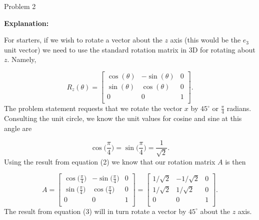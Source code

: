 \begin{problem}{Problem 2}
\begin{highlight}[Solution]
        \noindent \textbf{Explanation:} \vspace*{1em}

        For starters, if we wish to rotate a vector about the $z$ axis (this would be the $e_{3}$ unit vector) we need to use the standard rotation matrix in 3D for rotating about $z$. Namely,

        \setcounter{equation}{0}
        \begin{equation}
            R_{z}(\theta) = 
            \begin{bmatrix}
                \cos{(\theta)} & -\sin{(\theta)} & 0 \\
                \sin{(\theta)} & \cos{(\theta)} & 0 \\
                0 & 0 & 1 \\
            \end{bmatrix}.
        \end{equation}
        The problem statement requests that we rotate the vector $x$ by $45^{\circ}$ or $\frac{\pi}{4}$ radians. Consulting the unit circle, we know the unit values for cosine and sine at this angle are

        \begin{equation}
            \cos{\Big(\frac{\pi}{4}\Big)} = \sin{\Big(\frac{\pi}{4}\Big)} = \frac{1}{\sqrt{2}}.
        \end{equation}
        Using the result from equation (2) we know that our rotation matrix $A$ is then

        \begin{equation}
            A = 
            \begin{bmatrix}
                \cos{\Big(\frac{\pi}{4}\Big)} & -\sin{\Big(\frac{\pi}{4}\Big)} & 0 \\
                \sin{\Big(\frac{\pi}{4}\Big)} & \cos{\Big(\frac{\pi}{4}\Big)} & 0 \\
                0 & 0 & 1 \\
            \end{bmatrix}
            = 
            \begin{bmatrix}
                1 / \sqrt{2} & -1 / \sqrt{2} & 0 \\
                1 / \sqrt{2} & 1 / \sqrt{2} & 0 \\
                0 & 0 & 1 \\
            \end{bmatrix}.
        \end{equation}
        The result from equation (3) will in turn rotate a vector by $45^{\circ}$ about the $z$ axis.
    \end{highlight}
\end{problem}

